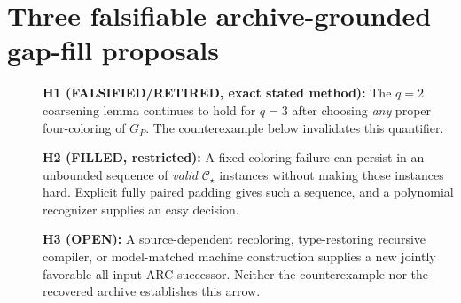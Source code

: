 \documentclass[11pt]{article}
\newcommand{\CS}{\mathcal C_{\star}}
\begin{document}
\section{Three falsifiable archive-grounded gap-fill proposals}
\begin{description}
\item[] \textbf{H1 (FALSIFIED/RETIRED, exact stated method):} The \(q=2\) coarsening lemma continues to hold for \(q=3\) after choosing \emph{any} proper four-coloring of \(G_P\). The counterexample below invalidates this quantifier.
\item[] \textbf{H2 (FILLED, restricted):} A fixed-coloring failure can persist in an unbounded sequence of \emph{valid} \(\CS\) instances without making those instances hard. Explicit fully paired padding gives such a sequence, and a polynomial recognizer supplies an easy decision.
\item[] \textbf{H3 (OPEN):} A source-dependent recoloring, type-restoring recursive compiler, or model-matched machine construction supplies a new jointly favorable all-input ARC successor. Neither the counterexample nor the recovered archive establishes this arrow.
\end{description}
\end{document}
